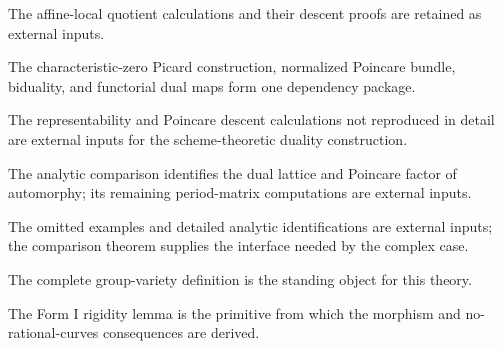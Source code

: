 \begin{remark}
\label{ch02-sec07-unread-results}
The affine-local quotient calculations and their descent proofs are retained as
external inputs.
\notready
\end{remark}

\begin{remark}
\label{ch02-sec08-coverage}
The characteristic-zero Picard construction, normalized Poincare bundle,
biduality, and functorial dual maps form one dependency package.
\notready
\end{remark}

\begin{remark}
\label{ch02-sec08-unread-results}
The representability and Poincare descent calculations not reproduced in detail
are external inputs for the scheme-theoretic duality construction.
\notready
\end{remark}

\begin{remark}
\label{ch02-sec09-coverage}
The analytic comparison identifies the dual lattice and Poincare factor of
automorphy; its remaining period-matrix computations are external inputs.
\notready
\end{remark}

\begin{remark}
\label{ch02-sec09-unread-results}
The omitted examples and detailed analytic identifications are external inputs;
the comparison theorem supplies the interface needed by the complex case.
\notready
\end{remark}

\begin{remark}
\label{ch02-sec04-abelian-variety}
The complete group-variety definition is the standing object for this theory.
\notready
\end{remark}

\begin{remark}
\label{ch02-sec04-rigidity}
The Form I rigidity lemma is the primitive from which the morphism and
no-rational-curves consequences are derived.
\notready
\end{remark}

